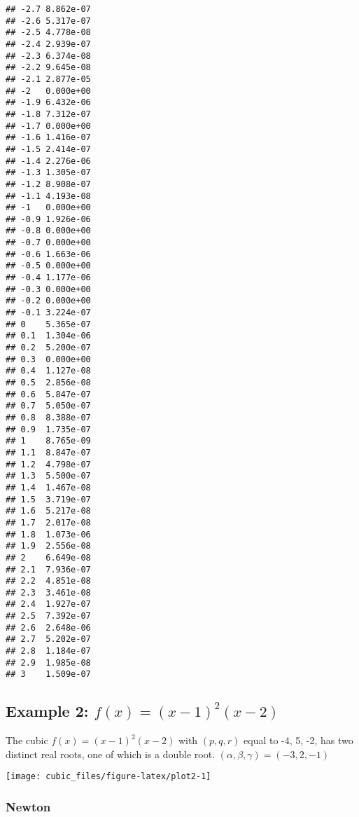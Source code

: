 \documentclass[
  12pt,
]{article}
\begin{document}
\begin{verbatim}
## -2.7 8.862e-07
## -2.6 5.317e-07
## -2.5 4.778e-08
## -2.4 2.939e-07
## -2.3 6.374e-08
## -2.2 9.645e-08
## -2.1 2.877e-05
## -2   0.000e+00
## -1.9 6.432e-06
## -1.8 7.312e-07
## -1.7 0.000e+00
## -1.6 1.416e-07
## -1.5 2.414e-07
## -1.4 2.276e-06
## -1.3 1.305e-07
## -1.2 8.908e-07
## -1.1 4.193e-08
## -1   0.000e+00
## -0.9 1.926e-06
## -0.8 0.000e+00
## -0.7 0.000e+00
## -0.6 1.663e-06
## -0.5 0.000e+00
## -0.4 1.177e-06
## -0.3 0.000e+00
## -0.2 0.000e+00
## -0.1 3.224e-07
## 0    5.365e-07
## 0.1  1.304e-06
## 0.2  5.200e-07
## 0.3  0.000e+00
## 0.4  1.127e-08
## 0.5  2.856e-08
## 0.6  5.847e-07
## 0.7  5.050e-07
## 0.8  8.388e-07
## 0.9  1.735e-07
## 1    8.765e-09
## 1.1  8.847e-07
## 1.2  4.798e-07
## 1.3  5.500e-07
## 1.4  1.467e-08
## 1.5  3.719e-07
## 1.6  5.217e-08
## 1.7  2.017e-08
## 1.8  1.073e-06
## 1.9  2.556e-08
## 2    6.649e-08
## 2.1  7.936e-07
## 2.2  4.851e-08
## 2.3  3.461e-08
## 2.4  1.927e-07
## 2.5  7.392e-07
## 2.6  2.648e-06
## 2.7  5.202e-07
## 2.8  1.184e-07
## 2.9  1.985e-08
## 3    1.509e-07
\end{verbatim}

\normalsize

\subsection{\texorpdfstring{Example 2: \(f(x)=(x-1)^2(x-2)\)}{Example 2: f(x)=(x-1)\^{}2(x-2)}}\label{example-2-fxx-12x-2}

\footnotesize

\normalsize
The cubic \(f(x)=(x-1)^2(x-2)\) with \((p,q,r)\) equal to -4, 5, -2, has
two distinct real roots, one of which is a double root.
\((\alpha,\beta,\gamma)=(-3, 2, -1)\)

\footnotesize

\begin{center}\texttt{[image: cubic\_files/figure-latex/plot2-1]} \end{center}

\normalsize

\subsubsection{Newton}\label{newton-1}

\footnotesize
\end{document}
